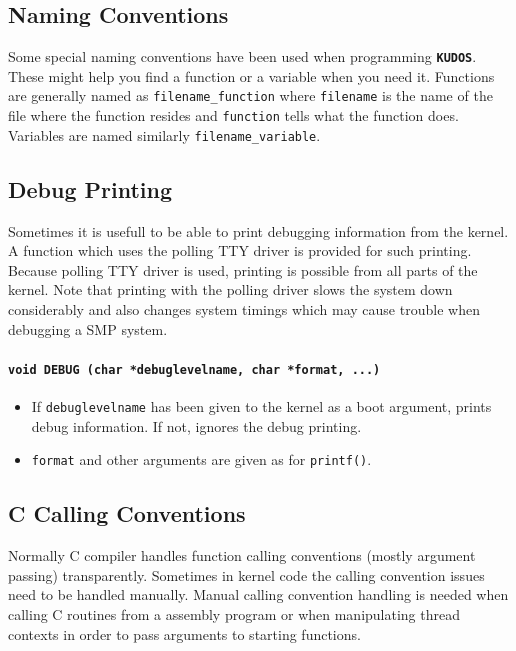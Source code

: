 \documentclass[twoside,a4paper]{report}
\makeatletter
\newenvironment{function}[3]{%
\paragraph{\texttt{#1 {\textbf{#2}} (#3)}}%
\index{#2@\texttt{#2}}%
\begin{itemize}%
}{%
\end{itemize}%
}
\newcommand{\kudos}{\texttt{\textbf{KUDOS}}}
\makeatother
\begin{document}
\subsection{Naming Conventions}


Some special naming conventions have been used when programming
\kudos{}.  These might help you find a function or a variable when
you need it. Functions are generally named as
\texttt{filename\_function} where \texttt{filename} is the name of the
file where the function resides and \texttt{function} tells what the
function does. Variables are named similarly
\texttt{filename\_variable}.

\subsection{Debug Printing}


Sometimes it is usefull to be able to print debugging information from
the kernel. A function which uses the polling TTY driver is provided
for such printing. Because polling TTY driver is used, printing is
possible from all parts of the kernel. Note that printing with the
polling driver slows the system down considerably and also changes
system timings which may cause trouble when debugging a SMP system.

\begin{function}{void}{DEBUG}{char *debuglevelname, char *format, ...}

\item If \texttt{debuglevelname} has been given to the kernel as a boot
argument, prints debug information. If not, ignores the debug printing.

\item \texttt{format} and other arguments are given as for \texttt{printf()}.

\end{function}


\subsection{C Calling Conventions}
\label{callingconvention}


Normally C compiler handles function calling conventions (mostly
argument passing) transparently. Sometimes in kernel code the calling
convention issues need to be handled manually. Manual calling
convention handling is needed when calling C routines from a assembly
program or when manipulating thread contexts in order to pass
arguments to starting functions.
\end{document}
